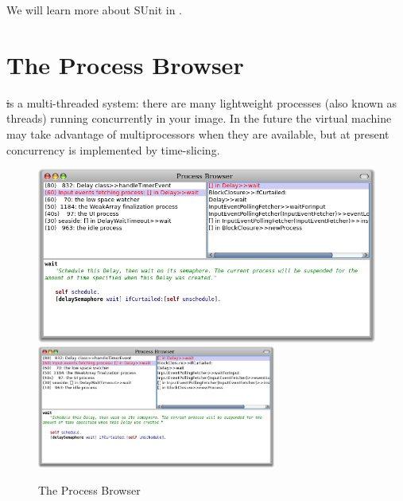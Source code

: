 \documentclass[a4paper,10pt,twoside]{book}
\begin{document}

We will learn more about SUnit in .


\section{The Process Browser}

\st is a multi-threaded system: there are many lightweight processes (also known as threads) running concurrently in your image. 
In the future the \pharo virtual machine may take advantage of multiprocessors when they are available, but at present concurrency is implemented by time-slicing.

\begin{figure}[btp]
	\begin{center}
	\ifluluelse
		{\includegraphics[width=\textwidth]{processBrowser}}
		{\includegraphics[width=0.7\textwidth]{processBrowser}}
	\end{center}
	\caption{The Process Browser}
\end{figure}
\end{document}
